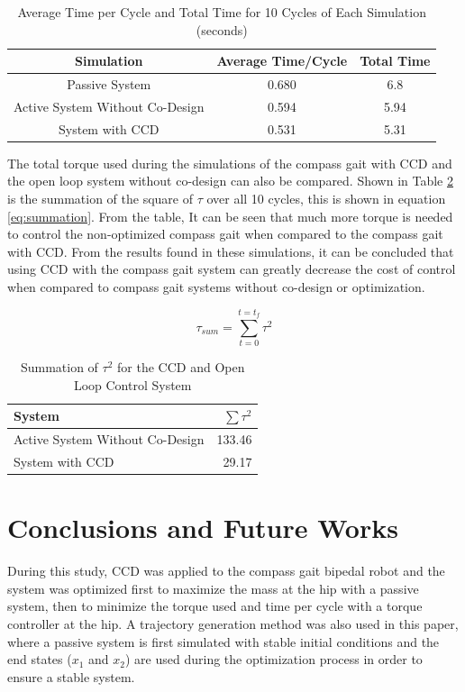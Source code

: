 \documentclass{./springer/svjour3}
\begin{document}
\begin{table}[h]
\centering
\caption{Average Time per Cycle and Total Time for 10 Cycles of Each Simulation (seconds)}
\begin{tabular}{ccc}
\toprule
Simulation & Average Time/Cycle & Total Time \\
\midrule
Passive System & 0.680 & 6.8 \\
Active System Without Co-Design & 0.594 & 5.94 \\
System with CCD & 0.531 & 5.31\\
\end{tabular}
\label{tab:time}
\end{table}

The total torque used during the simulations of the compass gait with CCD and the open loop system without co-design can also be compared. Shown in Table \ref{tab:tautot} is 
the summation of the square of $\tau$ over all 10 cycles, this is shown in equation \ref{eq:summation}. From the table, It can be seen that much more torque is needed to control 
the non-optimized 
compass gait when compared to the compass gait with CCD. From the results found in these simulations, it can be concluded that using CCD with the compass gait 
system can greatly decrease the cost of control when compared to compass gait systems without co-design or optimization.

\begin{equation}
\label{eq:summation}
\tau_{sum} = 
\sum_{t = 0}^{t = t_f}
\tau^2
\end{equation}

\begin{table}[h]
\centering
\caption{Summation of $\tau^2$ for the CCD and Open Loop Control System}
\begin{tabular}{lr}
\toprule
System & $\sum \tau^2$ \\
\midrule
Active System Without Co-Design & 133.46\\
System with CCD & 29.17\\
\end{tabular}
\label{tab:tautot}
\end{table}


\section{Conclusions and Future Works}

During this study, CCD was applied to the compass gait bipedal robot and the system was optimized first to maximize the mass at the hip with a passive system, 
then to minimize the torque used and time per cycle with a torque controller at the hip. A trajectory generation method was also used in this paper, 
where a passive system is first simulated with stable initial conditions and the end states ($x_1$ and $x_2$) are used during the optimization process in order to 
ensure a stable system.
\end{document}
